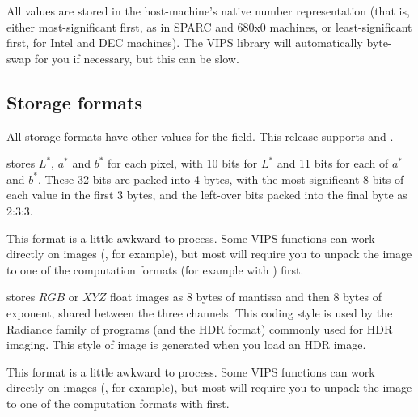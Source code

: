 All values are stored in the host-machine's native number representation (that
is, either most-significant first, as in SPARC and 680x0 machines, or
least-significant first, for Intel and DEC machines). The VIPS library will 
automatically byte-swap for you if necessary, but this can be slow.

\subsection{Storage formats}

All storage formats have other values for the  field. This
release supports  and .

 stores $L^{*}$, $a^{*}$ and $b^{*}$ for each pixel,
with 10 bits for $L^{*}$ and 11 bits for each of $a^{*}$ and $b^{*}$. These
32 bits are packed into 4 bytes, with the most significant 8 bits of each
value in the first 3 bytes, and the left-over bits packed into the final
byte as 2:3:3.

This format is a little awkward to process. Some VIPS functions can work
directly on  images (, for
example), but most will require you to unpack the image to one of the
computation formats (for example with ) first.

 stores $RGB$ or $XYZ$ float images as 8 bytes of mantissa
and then 8 bytes of exponent, shared between the three channels. This coding
style is used by the Radiance family of programs (and the HDR format) commonly
used for HDR imaging. This style of image is generated when you load an HDR
image.

This format is a little awkward to process. Some VIPS functions can work
directly on  images (, for
example), but most will require you to unpack the image to one of the
computation formats with  first.

